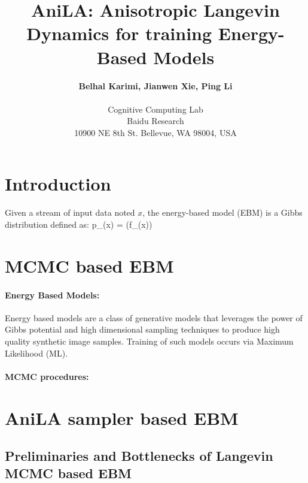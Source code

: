 \documentclass{article}
\begin{document}
\title{AniLA: Anisotropic Langevin Dynamics for training Energy-Based Models}

 \author{\textbf{Belhal Karimi, Jianwen Xie, Ping Li} \\\\
 Cognitive Computing Lab\\
 Baidu Research\\
   10900 NE 8th St. Bellevue, WA 98004, USA
 }

\date{}
\maketitle

\begin{abstract}
\end{abstract}

\section{Introduction}

Given a stream of input data noted $x$, the energy-based model (EBM) is a Gibbs distribution defined as:
\beq\label{eq:ebm}
p_{\theta}(x) =  (f_{\theta}(x))
\eeq


\section{MCMC based EBM}

\paragraph{Energy Based Models: }
Energy based models \cite{lecun2006tutorial,ngiam2011learning} are a class of generative models that leverages the power of Gibbs potential and high dimensional sampling techniques to produce high quality synthetic image samples.
Training of such models occurs via Maximum Likelihood (ML).

\paragraph{MCMC procedures: }



\section{AniLA sampler based EBM}

\subsection{Preliminaries and Bottlenecks of Langevin MCMC based EBM}
\end{document}
